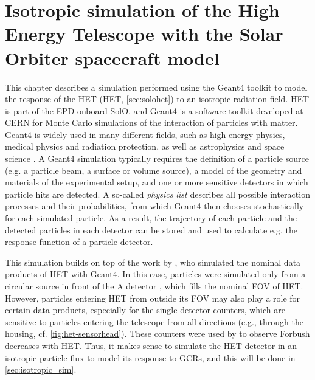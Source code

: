 \chapter{Isotropic simulation of the High Energy Telescope with the Solar Orbiter spacecraft model}
\label{chp:HETSimulation}

This chapter describes a simulation performed using the \acl{Geant4} toolkit \citep[\acs{Geant4},][]{Agostinelli-2003} to model the response of the \acl{HET} (\acs{HET}, \autoref{sec:solohet}) to an isotropic radiation field. \ac{HET} is part of the \acl{EPD} \citep[\acs{EPD},][]{RodriguezPacheco-2019-EPD} onboard \ac{SolO}, and \ac{Geant4} is a software toolkit developed at CERN for Monte Carlo simulations of the interaction of particles with matter. \ac{Geant4} is widely used in many different fields, such as high energy physics, medical physics and radiation protection, as well as astrophysics and space science \citep{Allison-2006}. A \ac{Geant4} simulation typically requires the definition of a particle source (e.g. a particle beam, a surface or volume source), a model of the geometry and materials of the experimental setup, and one or more sensitive detectors in which particle hits are detected. A so-called \textit{physics list} describes all possible interaction processes and their probabilities, from which \ac{Geant4} then chooses stochastically for each simulated particle. As a result, the trajectory of each particle and the detected particles in each detector can be stored and used to calculate e.g. the response function of a particle detector.

This simulation builds on top of the work by \citet{Elftmann-2020-PhD}, who simulated the nominal data products of \ac{HET} with \ac{Geant4}. In this case, particles were simulated only from a circular source in front of the A detector \citep[see][Figure 5.1]{Elftmann-2020-PhD}, which fills the nominal \ac{FOV} of \ac{HET}. However, particles entering \ac{HET} from outside its \ac{FOV} may also play a role for certain data products, especially for the single-detector counters, which are sensitive to particles entering the telescope from all directions (e.g., through the housing, cf. \autoref{fig:het-sensorhead}). These counters were used by \citet{Forstner-2021-SolO} to observe Forbush decreases with \ac{HET}. Thus, it makes sense to simulate the \ac{HET} detector in an isotropic particle flux to model its response to \acp{GCR}, and this will be done in \autoref{sec:isotropic_sim}.

